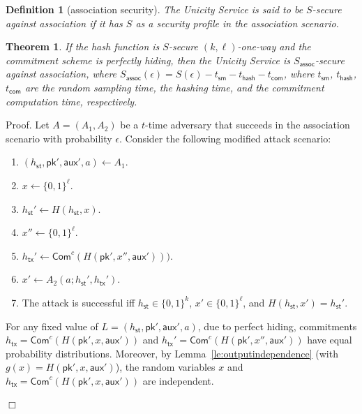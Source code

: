 \documentclass{article}
\newtheorem{definition}{Definition}[section]
\newtheorem{theorem}{Theorem}[section]
\newenvironment{proof}{\textsf{Proof}.}{\hfill$\Box$}
\newcommand{\pubkey}[0]{\mathsf{pk}}
\newcommand{\commitc}[0]{\mathsf{Com}^{c}}
\newcommand{\sthash}[0]{h_\mathsf{st}}
\newcommand{\txhash}[0]{h_\mathsf{tx}}
\newcommand{\auxd}[0]{\mathsf{aux}}
\begin{document}
\begin{definition}[association security]
The Unicity Service is said to be $S$-secure against association if it has $S$ as a security profile in the association scenario.
\end{definition}


\begin{theorem}
If the hash function is $S$-secure $(k,\ell)$-one-way and the commitment scheme is perfectly hiding, then the Unicity Service is $S_\mathsf{assoc}$-secure against association, where $S_\mathsf{assoc}(\epsilon)= S(\epsilon) - t_\mathsf{sm} - t_\mathsf{hash} - t_\mathsf{com}$, where
$t_\mathsf{sm}$, $t_\mathsf{hash}$, $t_\mathsf{com}$ are the random sampling time, the hashing time, and the commitment computation time, respectively.
\end{theorem}
\begin{proof}
Let $A=(A_1,A_2)$ be a $t$-time adversary that succeeds in the association scenario with probability $\epsilon$. Consider the following modified attack scenario:
\begin{enumerate}
\item $(\sthash, \pubkey', \auxd', a)\gets A_1$.
\item $x\gets \{0,1\}^\ell$.
\item $\sthash'\gets H(\sthash,x)$.
\item $x''\gets \{0,1\}^\ell$.
\item $\txhash'\gets\commitc(H(\pubkey',x'',\auxd')))$.
\item $x'\gets A_2(a; \sthash',\txhash')$.
\item The attack is successful iff $\sthash\in\{0,1\}^k$, $x'\in\{0,1\}^\ell$, and $H(\sthash,x')=\sthash'$.
\end{enumerate}

\noindent For any fixed value of $L=(\sthash, \pubkey', \auxd', a)$, due to perfect hiding, commitments $\txhash=\commitc(H(\pubkey',x,\auxd'))$ and $\txhash'=\commitc(H(\pubkey',x'',\auxd'))$ have equal probability distributions. Moreover, by Lemma~\ref{le:outputindependence} (with $g(x)=H(\pubkey',x,\auxd')$), the random variables $x$ and $\txhash=\commitc(H(\pubkey',x,\auxd'))$ are independent.


\end{proof}
\end{document}
